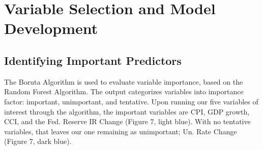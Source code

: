 \section{Variable Selection and Model Development}
\subsection{Identifying Important Predictors}
The Boruta Algorithm is used to evaluate variable importance, based on the Random Forest Algorithm. The output categorizes variables into importance factor: important, unimportant, and tentative. Upon running our five variables of interest through the algorithm, the important variables are CPI, GDP growth, CCI, and the Fed. Reserve IR Change (Figure 7, light blue). With no tentative variables, that leaves our one remaining as unimportant; Un. Rate Change (Figure 7, dark blue).
\vspace{0.8em}

